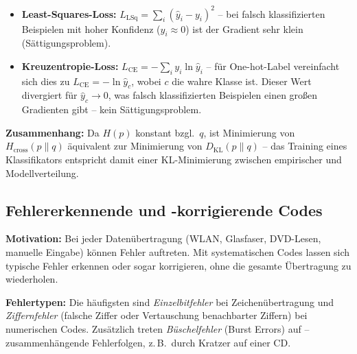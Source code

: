 \begin{itemize}[leftmargin=1.5em]
    \item \textbf{Least-Squares-Loss:} $L_\mathrm{LSq} = \sum_i (\hat{y}_i - y_i)^2$ -- bei falsch klassifizierten Beispielen mit hoher Konfidenz ($\hat{y}_i \approx 0$) ist der Gradient sehr klein (Sättigungsproblem).
    \item \textbf{Kreuzentropie-Loss:} $L_\mathrm{CE} = -\sum_i y_i \ln \hat{y}_i$ -- für One-hot-Label vereinfacht sich dies zu $L_\mathrm{CE} = -\ln \hat{y}_c$, wobei $c$ die wahre Klasse ist. Dieser Wert divergiert für $\hat{y}_c \to 0$, was falsch klassifizierten Beispielen einen großen Gradienten gibt -- kein Sättigungsproblem.
\end{itemize}


\textbf{Zusammenhang:} Da $H(p)$ konstant bzgl.\ $q$, ist Minimierung von $H_\mathrm{cross}(p\|q)$ äquivalent zur Minimierung von $D_\mathrm{KL}(p\|q)$ -- das Training eines Klassifikators entspricht damit einer KL-Minimierung zwischen empirischer und Modellverteilung.

\newpage

\subsection{Fehlererkennende und -korrigierende Codes}

\textbf{Motivation:} Bei jeder Datenübertragung (WLAN, Glasfaser, DVD-Lesen, manuelle Eingabe) können Fehler auftreten. Mit systematischen Codes lassen sich typische Fehler erkennen oder sogar korrigieren, ohne die gesamte Übertragung zu wiederholen.

\textbf{Fehlertypen:} Die häufigsten sind \emph{Einzelbitfehler} bei Zeichenübertragung und \emph{Ziffernfehler} (falsche Ziffer oder Vertauschung benachbarter Ziffern) bei numerischen Codes. Zusätzlich treten \emph{Büschelfehler} (Burst Errors) auf -- zusammenhängende Fehlerfolgen, z.\,B.\ durch Kratzer auf einer CD.


